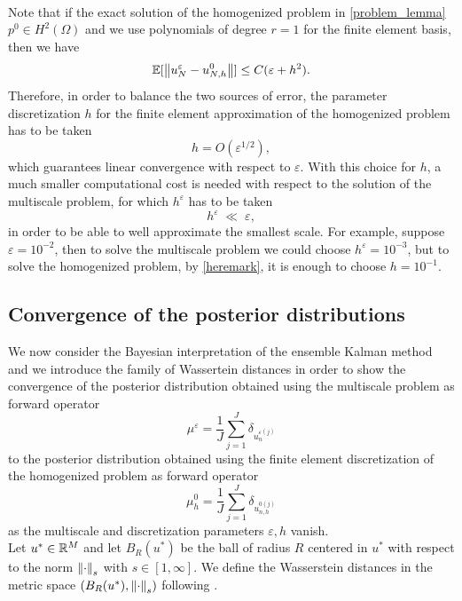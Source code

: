 \documentclass[10pt]{article}
\begin{document}
\begin{remark}
\leavevmode \\
Note that if the exact solution of the homogenized problem in \eqref{problem_lemma} $p^0 \in H^{2}(\Omega)$ and we use polynomials of degree $r = 1$ for the finite element basis, then we have
\begin{equation*}
\mathbb{E}[ \left\|u_N^{\varepsilon} - u_{N,h}^0\right\| ] \le C (\varepsilon + h^2).
\end{equation*}
Therefore, in order to balance the two sources of error, the parameter discretization $h$ for the finite element approximation of the homogenized problem has to be taken 
\begin{equation}
\label{heremark}
h = O( \varepsilon^{1/2} ),
\end{equation}
which guarantees linear convergence with respect to $\varepsilon$. With this choice for $h$, a much smaller computational cost is needed with respect to the solution of the multiscale problem, for which $h^{\varepsilon}$ has to be taken 
\[ h^{\varepsilon} \; \ll \; \varepsilon, \]
in order to be able to well approximate the smallest scale. For example, suppose $\varepsilon = 10^{-2}$, then to solve the multiscale problem we could choose $h^{\varepsilon} = 10^{-3}$, but to solve the homogenized problem, by \eqref{heremark}, it is enough to choose $h = 10^{-1}$. 
\end{remark}

\subsection{Convergence of the posterior distributions}

We now consider the Bayesian interpretation of the ensemble Kalman method and we introduce the family of Wassertein distances in order to show the convergence of the posterior distribution obtained using the multiscale problem as forward operator 
\[ \mu^{\varepsilon} = \frac{1}{J} \sum_{j=1}^J \delta_{u_{n}^{\varepsilon(j)}} \]
to the posterior distribution obtained using the finite element discretization of the homogenized problem as forward operator
\[ \mu^0_h = \frac{1}{J} \sum_{j=1}^J \delta_{u_{n,h}^{0(j)}} \]
as the multiscale and discretization parameters $\varepsilon, h$ vanish. \\
Let $u^* \in \mathbb{R}^M$ and let $B_R(u^*)$ be the ball of radius $R$ centered in $u^*$ with respect to the norm $\left\|\cdot\right\|_s$ with $s \in [1,\infty]$. We define the Wasserstein distances in the metric space $(B_R(u^*), \left\|\cdot\right\|_s)$ following \cite{San15}.
\end{document}
